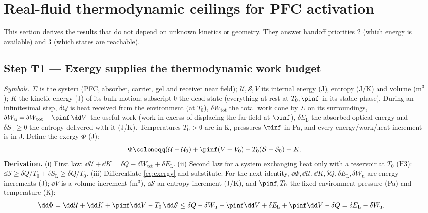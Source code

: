 \section{Real-fluid thermodynamic ceilings for PFC activation}\label{sec:thermo}
This section derives the results that do not depend on unknown kinetics or geometry. They answer
handoff priorities 2 (which energy is available) and 3 (which states are reachable).

\subsection{Step T1 --- Exergy supplies the thermodynamic work budget}\label{sec:exergy}
\emph{Symbols.} $\Sigma$ is the system (PFC, absorber, carrier, gel and receiver near field); $\mathcal U,\mathcal S,V$
its internal energy (J), entropy (J/K) and volume (m$^3$); $K$ the kinetic energy (J) of its bulk motion; subscript 0 the
dead state (everything at rest at $T_0,\pinf$ in its stable phase). During an infinitesimal step,
$\delta Q$ is heat received from the environment (at $T_0$), $\delta W_{\mathrm{tot}}$ the total work done
by $\Sigma$ on its surroundings, $\delta W_{\mathrm u}=\delta W_{\mathrm{tot}}-\pinf\,\dd V$ the useful work
(work in excess of displacing the far field at $\pinf$), $\delta E_{\mathrm L}$ the absorbed optical energy and
$\delta S_{\mathrm L}\ge0$ the entropy delivered with it (J/K). Temperatures $T_0>0$ are in K,
pressures $\pinf$ in Pa, and every energy/work/heat increment is in J. Define the exergy $\Phi$ (J):
\begin{equation}
\Phi\coloneqq (\mathcal U-\mathcal U_0)+\pinf (V-V_0)-T_0(\mathcal S-\mathcal S_0)+K .\label{eq:exergy}
\end{equation}
\textbf{Derivation.} (i) First law: $\dd\mathcal U+\dd K=\delta Q-\delta W_{\mathrm{tot}}+\delta E_{\mathrm L}$.
(ii) Second law for a system exchanging heat only with a reservoir at $T_0$ (H3):
$\dd\mathcal S\ge \delta Q/T_0+\delta S_{\mathrm L}\ge\delta Q/T_0$. (iii) Differentiate \eqref{eq:exergy} and substitute.
For the next identity, $\dd\Phi,\dd\mathcal U,\dd K,\delta Q,\delta E_{\mathrm L},\delta W_{\mathrm u}$ are
energy increments (J); $\dd V$ is a volume increment (m$^3$), $\dd\mathcal S$ an entropy increment (J/K),
and $\pinf,T_0$ the fixed environment pressure (Pa) and temperature (K):
\begin{align}
\dd\Phi&=\dd\mathcal U+\dd K+\pinf\dd V-T_0\,\dd\mathcal S
\le \delta Q-\delta W_{\mathrm u}-\pinf\dd V+\delta E_{\mathrm L}+\pinf\dd V-\delta Q
=\delta E_{\mathrm L}-\delta W_{\mathrm u}.\label{eq:dphi}
\end{align}
